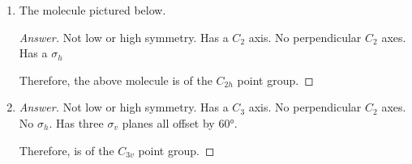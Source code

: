 \documentclass[../psets.tex]{subfiles}
\begin{document}
\begin{enumerate}[label={\Roman*)}]
\begin{enumerate}[label={\alph*)}]
\begin{center}
        \end{center}
        \begin{proof}[Answer]
            Not low or high symmetry. Has a $C_2$ axis. No perpendicular $C_2$ axes. Has a $\sigma_h$.\par
            Therefore, the above molecule is of the $C_{2h}$ point group.
        \end{proof}
        \item The molecule pictured below.
        \begin{center}
            \vspace{1em}
            \vspace{1em}
        \end{center}
        \begin{proof}[Answer]
            Not low or high symmetry. Has a $C_2$ axis. No perpendicular $C_2$ axes. Has a $\sigma_h$\par
            Therefore, the above molecule is of the $C_{2h}$ point group.
        \end{proof}
        \item {}
        \begin{proof}[Answer]
            Not low or high symmetry. Has a $C_3$ axis. No perpendicular $C_2$ axes. No $\sigma_h$. Has three $\sigma_v$ planes all offset by $\ang{60}$.\par
            Therefore,  is of the $C_{3v}$ point group.

\end{proof}
\end{enumerate}
\end{enumerate}
\end{document}
